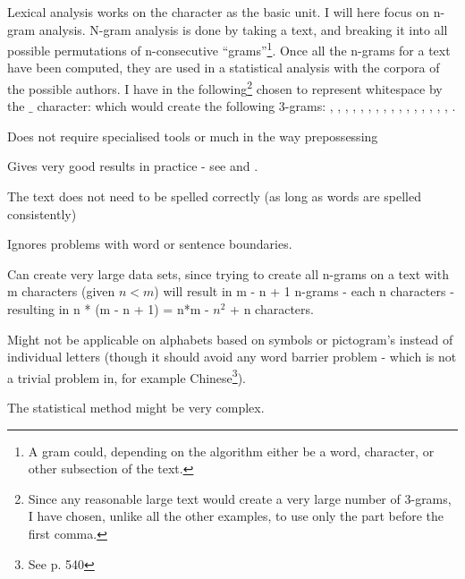 {\label{character}
Lexical analysis works on the character as the basic unit. I will here focus on n-gram analysis. N-gram analysis is done by taking a text, and breaking it into all possible permutations of n-consecutive ``grams''\footnote{A gram could, depending on the algorithm either be a word, character, or other subsection of the text.}. Once all the n-grams for a text have been computed, they are used in a statistical analysis with the corpora of the possible authors. 
}
{
I have in the following\footnote{Since any reasonable large text would create a very large number of 3-grams, I have chosen, unlike all the other examples, to use only the part before the first comma.} chosen to represent whitespace by the $\_$ character:
which would create the following 3-grams: , , , , , , , , , , , , , , , , . 
}
{
\item Does not require specialised tools or much in the way prepossessing
\item Gives very good results in practice - see \cite{nr4} and \cite{nr3}.
\item The text does not need to be spelled correctly (as long as words are spelled consistently)
\item Ignores problems with word or sentence boundaries.
}
{
\item Can create very large data sets, since trying to create all n-grams on a text with m characters (given $n < m$) will result in m - n + 1 n-grams - each n characters - resulting in n * (m - n + 1) = n*m - $n^2$ + n characters.
\item Might not be applicable on alphabets based on symbols or pictogram's instead of individual letters (though it should avoid any word barrier problem - which is not a trivial problem in, for example Chinese\footnote{See \cite{nr1} p. 540}).
\item The statistical method might be very complex.
}

